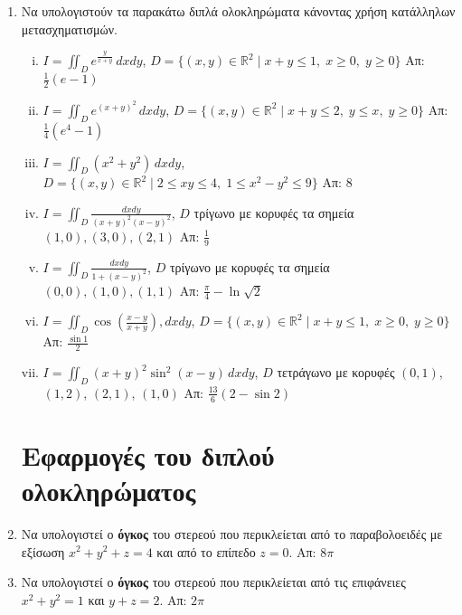 \begin{enumerate}
  \item Να υπολογιστούν τα παρακάτω διπλά ολοκληρώματα κάνοντας χρήση 
    κατάλληλων μετασχηματισμών.
    \begin{enumerate}[i)]
      \item $I=\iint_{D}e^{\frac{y}{x+y}}\,dxdy$, \quad $ D= \{(x,y)\in \mathbb{R}^{2} 
        \mid x+y \leq 1,\; x \geq 0,\; y \geq 0 \}$ \hfill Απ: $\frac{1}{2}(e-1)$
      \item $ I= \iint_{D}e^{(x+y)^{2}}\,dxdy $, \quad $ D = \{ (x,y) \in \mathbb{R}^{2}
        \mid x+y \leq 2,\; y \leq x,\; y \geq 0 \} $ \hfill Απ: $ \frac{1}{4} (e^{4}-1)$ 
      \item $ I=\iint_{D}(x^{2}+y^{2})\,dxdy $, \quad $ D= \{(x,y)\in \mathbb{R}^{2} 
        \mid 2 \leq xy \leq 4,\; 1 \leq x^{2}-y^{2} \leq 9 \} $ \hfill Απ: 8 
      \item $I=\iint_{D}\frac{dxdy}{(x+y)^2(x-y)^2}$, \quad $D$ τρίγωνο με κορυφές τα
        σημεία $(1,0), (3,0), (2,1)$  \hfill Απ: $\frac{1}{9}$ %
      \item $ I=\iint_{D} \frac{dxdy}{1+(x-y)^{2}} $, \quad $D$ τρίγωνο με κορυφές τα 
        σημεία $(0,0), (1,0), (1,1)$ \hfill Απ: $ \frac{\pi}{4} - \ln{\sqrt{ 2 }} $ 
      \item $ I=\iint_{D} \cos{\left(\frac{x-y}{x+y}\right)},dxdy $, \quad 
        $ D= \{(x,y)\in \mathbb{R}^{2} \mid x+y \leq 1,\; x \geq 0,\; y \geq 0 \} $ 
        \hfill Απ: $ \frac{\sin 1}{2} $ %
      \item $ I=\iint_{D}(x+y)^{2} \sin^{2}{(x-y)}\,dxdy $, \quad $ D $ τετράγωνο 
        με κορυφές $ (0,1) $, $ (1,2) $, $ (2,1) $, $ (1,0) $
        \hfill Απ: $ \frac{13}{6} (2 - \sin{2}) $ 
    \end{enumerate}

    \section*{Εφαρμογές του διπλού ολοκληρώματος} 

  \item Να υπολογιστεί ο \textbf{όγκος} του στερεού που περικλείεται από το 
    παραβολοειδές με εξίσωση $ x^{2}+y^{2}+z=4 $ και από το επίπεδο $ z=0 $.
    \hfill Απ: $ 8\pi $ 

  \item Να υπολογιστεί ο \textbf{όγκος} του στερεού που περικλείεται από τις 
    επιφάνειες $ x^{2}+y^{2}=1 $ και $ y+z=2 $.
    \hfill Απ: $ 2 \pi $ 


\end{enumerate}
